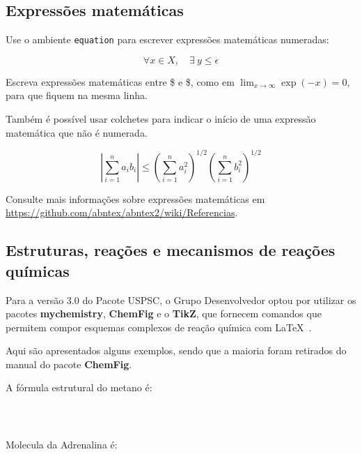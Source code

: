 \subsection{Expressões matem\'aticas}

Use o ambiente \texttt{equation} para escrever
expressões matem\'aticas numeradas:

\begin{equation}
\forall x \in X, \quad \exists \: y \leq \epsilon
\end{equation}

Escreva expressões matem\'aticas entre \$ e \$, como em $ \lim_{x \to \infty}
\exp(-x) = 0 $, para que fiquem na mesma linha.

Tamb\'em \'e possível usar colchetes para indicar o início de uma expressão
matem\'atica que não \'e numerada.

\[
\left|\sum_{i=1}^n a_ib_i\right|
\le
\left(\sum_{i=1}^n a_i^2\right)^{1/2}
\left(\sum_{i=1}^n b_i^2\right)^{1/2}
\]

Consulte mais informações sobre expressões matem\'aticas em
\url{https://github.com/abntex/abntex2/wiki/Referencias}.

\subsection{Estruturas, reações e mecanismos de reações químicas}\label{Reaquimica}
Para a versão 3.0 do Pacote USPSC, o Grupo Desenvolvedor optou por utilizar os pacotes \textbf{mychemistry},  \textbf{ChemFig} e o \textbf{TikZ}, que fornecem comandos que permitem compor esquemas complexos de reação química com \LaTeX\ . 

Aqui são apresentados alguns exemplos, sendo que a maioria foram retirados do manual do pacote \textbf{ChemFig}\cite{ChemFigPac}. 


A fórmula estrutural do metano \'e:


 \\

\begin{verbatim}
\end{verbatim} 

Molecula da Adrenalina \'e:

 \\

\begin{verbatim}
\end{verbatim}

